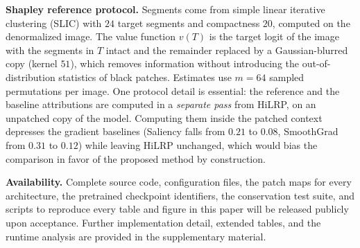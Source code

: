 \documentclass[lettersize,journal]{IEEEtran}
\theoremstyle{definition}
\theoremstyle{plain}
\begin{document}
\textbf{Shapley reference protocol.} Segments come from simple linear iterative
clustering (SLIC) with $24$ target segments and compactness $20$, computed on
the denormalized image. The value
function $v(T)$ is the target logit of the image with the segments in $T$ intact
and the remainder replaced by a Gaussian-blurred copy (kernel $51$), which
removes information without introducing the out-of-distribution statistics of
black patches. Estimates use $m{=}64$ sampled permutations per image. One
protocol detail is essential: the reference and the baseline attributions are
computed in a \emph{separate pass} from HiLRP, on an unpatched copy of the model.
Computing them inside the patched context depresses the gradient baselines
(Saliency falls from $0.21$ to $0.08$, SmoothGrad from $0.31$ to $0.12$) while
leaving HiLRP unchanged, which would bias the comparison in favor of the
proposed method by construction.

\textbf{Availability.} Complete source code, configuration files, the patch maps
for every architecture, the pretrained checkpoint identifiers, the conservation
test suite, and scripts to reproduce every table and figure in this paper will
be released publicly upon acceptance. Further implementation detail, extended tables, and the runtime
analysis are provided in the supplementary material.
\end{document}
